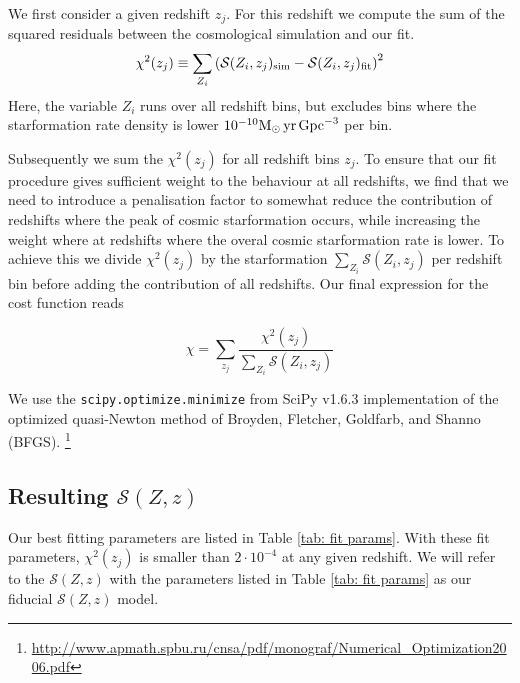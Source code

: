\documentclass[twocolumn]{aastex631}
\newcommand{\Msun}{\ensuremath{\rm{M}_{\odot}}\xspace}
\newcommand{\yr}{\ensuremath{\,\rm{yr}}\xspace}
\newcommand{\Mpc}{\ensuremath{\,\rm{Gpc}}\xspace}
\newcommand{\SFRDzZ}{\ensuremath{\mathcal{S}(Z,z)}\xspace}
\begin{document}
We first consider a given redshift $z_j$.  For this redshift we compute the sum of the squared residuals between the cosmological simulation and our fit.  
%
\begin{equation}
\label{eq: chisquare}
    \chi^2 (z_j) \equiv \sum_{Z_i} \left( 
        \mathcal{S}(Z_i,z_j)_{\rm sim} - 
        \mathcal{S}(Z_i,z_j)_{\rm fit}\right)^2
\end{equation}
%
Here, the variable $Z_i$ runs over all redshift bins, but excludes bins where the starformation rate density is lower $10^{-10} \Msun \yr \Mpc^{-3}$ per bin. 

Subsequently we sum the $\chi^2 (z_j)$ for all redshift bins $z_j$. To ensure that our fit procedure gives sufficient weight to the behaviour at all redshifts, we find that we need to introduce a penalisation factor to somewhat reduce the contribution of redshifts where the peak of cosmic starformation occurs, while increasing the weight where at redshifts where the overal cosmic starformation rate is lower.  To achieve this we divide $\chi^2 (z_j)$ by the starformation $\sum_{Z_i} \mathcal{S}(Z_i,z_j)$ per redshift bin before adding the contribution of all redshifts.  Our final expression for the cost function reads

\begin{equation}
\label{eq: cost function}
    \chi  = \sum_{z_j} \frac{ \chi^2 (z_j) } 
        {\sum_{Z_i} \mathcal{S}(Z_i,z_j)}
\end{equation}

We use the \texttt{scipy.optimize.minimize} 
from SciPy v1.6.3 implementation of the optimized quasi-Newton method of Broyden, Fletcher, Goldfarb, and Shanno (BFGS). \footnote{\url{http://www.apmath.spbu.ru/cnsa/pdf/monograf/Numerical_Optimization2006.pdf}}


\subsection{Resulting \SFRDzZ}
Our best fitting parameters are listed in Table \ref{tab: fit params}. With these fit parameters, $\chi^2(z_j)$ is smaller than $2\cdot 10^{-4}$ at any given redshift. We will refer to the \SFRDzZ with the parameters listed in Table \ref{tab: fit params} as our fiducial \SFRDzZ model. 
\end{document}
